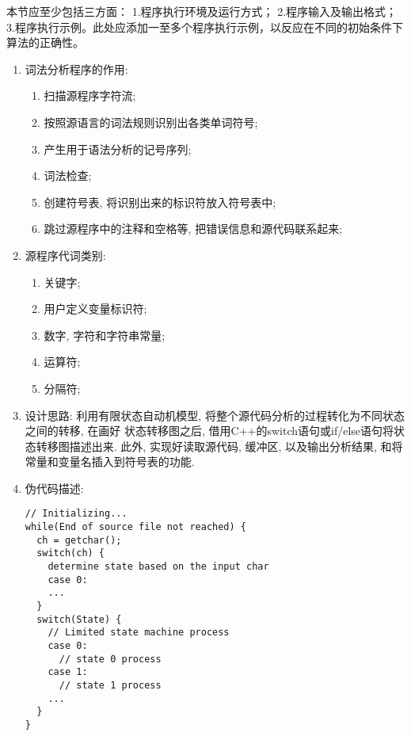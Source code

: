 本节应至少包括三方面：
1.程序执行环境及运行方式；
2.程序输入及输出格式；
3.程序执行示例。此处应添加一至多个程序执行示例，以反应在不同的初始条件下算法的正确性。
\begin{enumerate}
\item 词法分析程序的作用:
  \begin{enumerate}
  \item 扫描源程序字符流;
  \item 按照源语言的词法规则识别出各类单词符号;
  \item 产生用于语法分析的记号序列;
  \item 词法检查;
  \item 创建符号表, 将识别出来的标识符放入符号表中;
  \item 跳过源程序中的注释和空格等, 把错误信息和源代码联系起来;
  \end{enumerate}
\item 源程序代词类别:
  \begin{enumerate}
    \item 关键字;
    \item 用户定义变量标识符;
    \item 数字, 字符和字符串常量;
    \item 运算符;
    \item 分隔符;
  \end{enumerate}
\item 设计思路:
  利用有限状态自动机模型, 将整个源代码分析的过程转化为不同状态之间的转移, 在画好
  状态转移图之后, 借用C++的switch语句或if/else语句将状态转移图描述出来. 此外, 
  实现好读取源代码, 缓冲区, 以及输出分析结果, 和将常量和变量名插入到符号表的功能.
\item 伪代码描述:
\begin{lstlisting}
// Initializing...
while(End of source file not reached) {
  ch = getchar();
  switch(ch) {
    determine state based on the input char
    case 0:
    ...
  }
  switch(State) {
    // Limited state machine process
    case 0:
      // state 0 process
    case 1:
      // state 1 process
    ...
  }
}
\end{lstlisting}
\end{enumerate}
